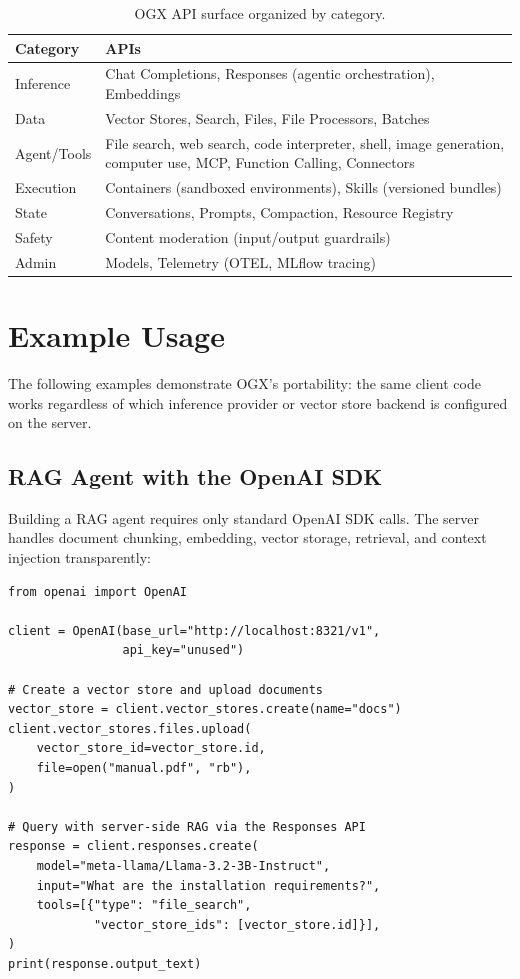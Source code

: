 \documentclass[11pt]{article}
\begin{document}
\begin{table}[htbp]
  \centering
  \small
  \setlength{\tabcolsep}{4pt}
  \renewcommand{\arraystretch}{1.15}
  \begin{tabularx}{\textwidth}{@{}l|X@{}}
  \toprule
  Category & APIs \\
  \midrule
  Inference & Chat Completions, Responses (agentic orchestration), Embeddings \\
  Data & Vector Stores, Search, Files, File Processors, Batches \\
  Agent/Tools & File search, web search, code interpreter, shell, image generation, computer use, MCP, Function Calling, Connectors \\
  Execution & Containers (sandboxed environments), Skills (versioned bundles) \\
  State & Conversations, Prompts, Compaction, Resource Registry \\
  Safety & Content moderation (input/output guardrails) \\
  Admin & Models, Telemetry (OTEL, MLflow tracing) \\
  \bottomrule
  \end{tabularx}
  \caption{OGX API surface organized by category.}
  \label{tab:apis}
\end{table}

\section{Example Usage}
\label{sec:examples}

The following examples demonstrate OGX's portability: the same client code works regardless of which inference provider or vector store backend is configured on the server.

\subsection{RAG Agent with the OpenAI SDK}

Building a RAG agent requires only standard OpenAI SDK calls. The server handles document chunking, embedding, vector storage, retrieval, and context injection transparently:

\begin{verbatim}
from openai import OpenAI

client = OpenAI(base_url="http://localhost:8321/v1",
                api_key="unused")

# Create a vector store and upload documents
vector_store = client.vector_stores.create(name="docs")
client.vector_stores.files.upload(
    vector_store_id=vector_store.id,
    file=open("manual.pdf", "rb"),
)

# Query with server-side RAG via the Responses API
response = client.responses.create(
    model="meta-llama/Llama-3.2-3B-Instruct",
    input="What are the installation requirements?",
    tools=[{"type": "file_search",
            "vector_store_ids": [vector_store.id]}],
)
print(response.output_text)
\end{verbatim}
\end{document}
